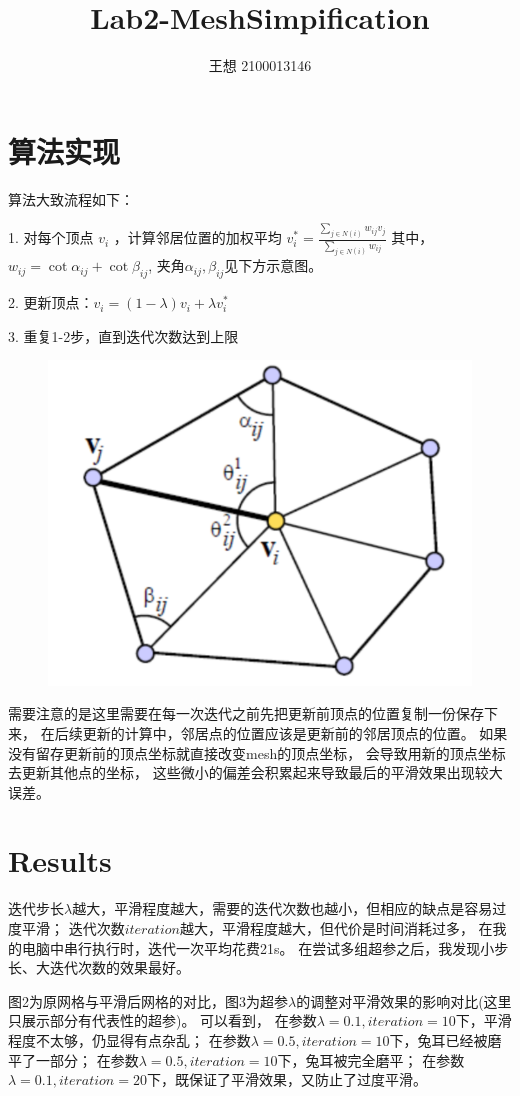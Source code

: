 \documentclass{ctexart}
\title{Lab2-MeshSimpification}
\author{王想 2100013146}
\date{}
\begin{document}
\maketitle

\section{算法实现}
算法大致流程如下：

1. 对每个顶点 $v_i$ ，计算邻居位置的加权平均
$v_i^*=\frac{\sum_{j\in N(i)}w_{ij} v_j}{\sum_{j\in N(i)} w_{ij}}$
其中， $w_{ij}=\cot \alpha_{ij} + \cot \beta_{ij}$, 夹角$\alpha_{ij},\beta_{ij}$见下方示意图。

2. 更新顶点：$v_i=(1-\lambda)v_i+\lambda v_i^*$

3. 重复1-2步，直到迭代次数达到上限

\begin{figure}[htbp]
    \centering
    \centering
    \includegraphics[width=0.6\linewidth]{figures/cotangent.png}
\end{figure}

需要注意的是这里需要在每一次迭代之前先把更新前顶点的位置复制一份保存下来，
在后续更新的计算中，邻居点的位置应该是更新前的邻居顶点的位置。
如果没有留存更新前的顶点坐标就直接改变mesh的顶点坐标，
会导致用新的顶点坐标去更新其他点的坐标，
这些微小的偏差会积累起来导致最后的平滑效果出现较大误差。

\section{Results}
迭代步长$\lambda$越大，平滑程度越大，需要的迭代次数也越小，但相应的缺点是容易过度平滑；
迭代次数$iteration$越大，平滑程度越大，但代价是时间消耗过多，
在我的电脑中串行执行时，迭代一次平均花费21s。
在尝试多组超参之后，我发现小步长、大迭代次数的效果最好。

图2为原网格与平滑后网格的对比，图3为超参$\lambda$的调整对平滑效果的影响对比(这里只展示部分有代表性的超参)。
可以看到，
在参数$\lambda= 0.1,iteration = 10$下，平滑程度不太够，仍显得有点杂乱；
在参数$\lambda= 0.5,iteration = 10$下，兔耳已经被磨平了一部分；
在参数$\lambda= 0.5,iteration = 10$下，兔耳被完全磨平；
在参数$\lambda= 0.1,iteration = 20$下，既保证了平滑效果，又防止了过度平滑。
\end{document}
